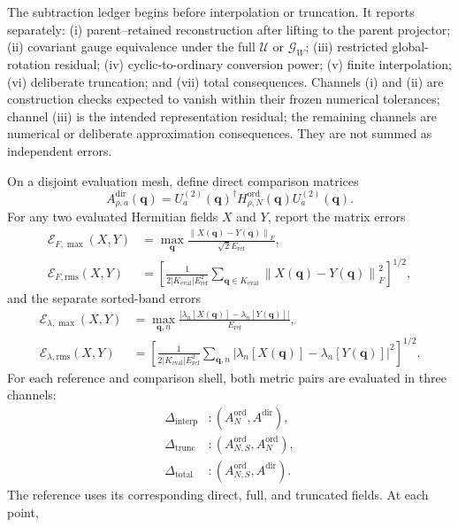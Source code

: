 \documentclass[11pt]{article}
\newcommand{\norm}[1]{\left\lVert #1\right\rVert}
\begin{document}
The subtraction ledger begins before interpolation or truncation. It reports separately:
(i) parent--retained reconstruction after lifting to the parent projector; (ii) covariant
gauge equivalence under the full $\mathcal U$ or $\mathcal G_W$; (iii) restricted global-
rotation residual; (iv) cyclic-to-ordinary conversion power; (v) finite interpolation;
(vi) deliberate truncation; and (vii) total consequences. Channels (i) and (ii) are
construction checks expected to vanish within their frozen numerical tolerances; channel
(iii) is the intended representation residual; the remaining channels are numerical or
deliberate approximation consequences. They are not summed as independent errors.

On a disjoint evaluation mesh, define direct comparison matrices
\begin{equation}
 A_{\rho,a}^{\mathrm{dir}}(\mathbf q)
 =U_a^{(2)}(\mathbf q)^\dagger
  H_{\rho,N}^{\mathrm{ord}}(\mathbf q)
  U_a^{(2)}(\mathbf q).
\end{equation}
For any two evaluated Hermitian fields $X$ and $Y$, report the matrix errors
\begin{align}
 \mathcal E_{F,\max}(X,Y)
 &=\max_{\mathbf q}\frac{\norm{X(\mathbf q)-Y(\mathbf q)}_F}{\sqrt{2}E_{\mathrm{ref}}},\\
 \mathcal E_{F,\mathrm{rms}}(X,Y)
 &=\left[
 \frac{1}{2|K_{\mathrm{eval}}|E_{\mathrm{ref}}^2}
 \sum_{\mathbf q\in K_{\mathrm{eval}}}
 \norm{X(\mathbf q)-Y(\mathbf q)}_F^2
 \right]^{1/2},
\end{align}
and the separate sorted-band errors
\begin{align}
 \mathcal E_{\lambda,\max}(X,Y)
 &=\max_{\mathbf q,n}
 \frac{|\lambda_n[X(\mathbf q)]-\lambda_n[Y(\mathbf q)]|}{E_{\mathrm{ref}}},\\
 \mathcal E_{\lambda,\mathrm{rms}}(X,Y)
 &=\left[
 \frac{1}{2|K_{\mathrm{eval}}|E_{\mathrm{ref}}^2}
 \sum_{\mathbf q,n}
 |\lambda_n[X(\mathbf q)]-\lambda_n[Y(\mathbf q)]|^2
 \right]^{1/2}.
\end{align}
For each reference and comparison shell, both metric pairs are evaluated in three
channels:
\begin{align}
 \Delta_{\mathrm{interp}}&:
 (A_N^{\mathrm{ord}},A^{\mathrm{dir}}),\\
 \Delta_{\mathrm{trunc}}&:
 (A_{N,S}^{\mathrm{ord}},A_N^{\mathrm{ord}}),\\
 \Delta_{\mathrm{total}}&:
 (A_{N,S}^{\mathrm{ord}},A^{\mathrm{dir}}).
\end{align}
The reference uses its corresponding direct, full, and truncated fields. At each point,
\end{document}
